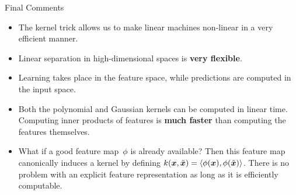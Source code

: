 \begin{vbframe}{Final Comments}

\begin{itemize}
\item The kernel trick allows us to make linear machines non-linear in a very
  efficient manner.
\item Linear separation in high-dimensional spaces is \textbf{very flexible}.

  \item Learning takes place in the feature space, while predictions are computed in the input space.
  \item Both the polynomial and Gaussian kernels can be computed in linear time. Computing inner products of features is \textbf{much faster} than computing the features themselves.
\item What if a good feature map~$\phi$ is already available?
Then this feature map canonically induces a kernel by
defining $k(\bm{x}, \tilde {\bm{x}}) = \left\langle \phi(\bm{x}), \phi(\tilde {\bm{x}}) \right\rangle$.
There is no problem with an explicit feature representation
as long as it is efficiently computable.
\end{itemize}
\end{vbframe}


\endlecture

